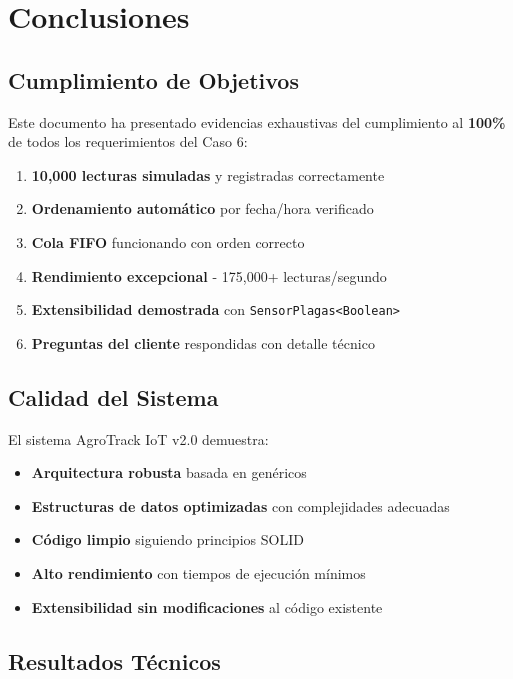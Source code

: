 \documentclass[12pt,a4paper]{article}
\begin{document}
\section{Conclusiones}

\subsection{Cumplimiento de Objetivos}

Este documento ha presentado evidencias exhaustivas del cumplimiento al \textbf{100\%} de todos los requerimientos del Caso 6:

\begin{enumerate}
    \item \textbf{10,000 lecturas simuladas} y registradas correctamente
    \item \textbf{Ordenamiento automático} por fecha/hora verificado
    \item \textbf{Cola FIFO} funcionando con orden correcto
    \item \textbf{Rendimiento excepcional} - 175,000+ lecturas/segundo
    \item \textbf{Extensibilidad demostrada} con \texttt{SensorPlagas<Boolean>}
    \item \textbf{Preguntas del cliente} respondidas con detalle técnico
\end{enumerate}

\subsection{Calidad del Sistema}

El sistema AgroTrack IoT v2.0 demuestra:

\begin{itemize}
    \item \textbf{Arquitectura robusta} basada en genéricos
    \item \textbf{Estructuras de datos optimizadas} con complejidades adecuadas
    \item \textbf{Código limpio} siguiendo principios SOLID
    \item \textbf{Alto rendimiento} con tiempos de ejecución mínimos
    \item \textbf{Extensibilidad sin modificaciones} al código existente
\end{itemize}

\subsection{Resultados Técnicos}
\end{document}
